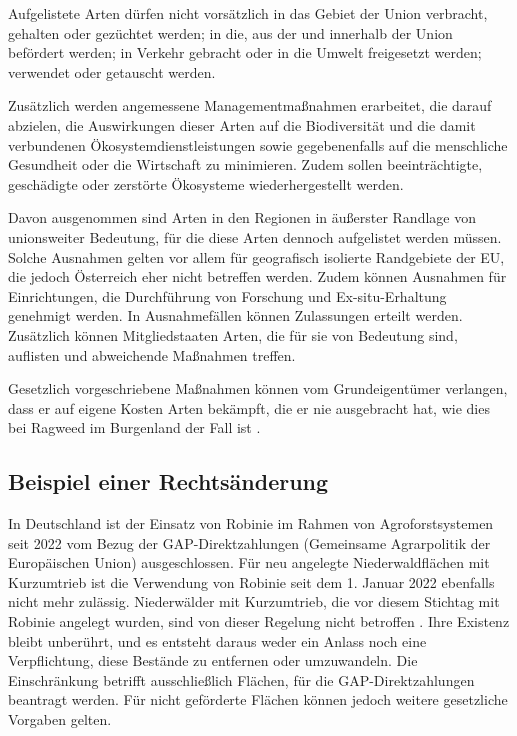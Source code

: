 \documentclass[twocolumn]{scrartcl}
\begin{document}
Aufgelistete Arten dürfen nicht vorsätzlich in das Gebiet der Union
verbracht, gehalten oder gezüchtet werden; in die, aus der und
innerhalb der Union befördert werden; in Verkehr gebracht oder in die
Umwelt freigesetzt werden; verwendet oder getauscht werden.

Zusätzlich werden angemessene Managementmaßnahmen erarbeitet, die
darauf abzielen, die Auswirkungen dieser Arten auf die Biodiversität
und die damit verbundenen Ökosystemdienstleistungen sowie
gegebenenfalls auf die menschliche Gesundheit oder die Wirtschaft zu
minimieren. Zudem sollen beeinträchtigte, geschädigte oder zerstörte
Ökosysteme wiederhergestellt werden.

Davon ausgenommen sind Arten in den Regionen in äußerster Randlage von
unionsweiter Bedeutung, für die diese Arten dennoch aufgelistet werden
müssen. Solche Ausnahmen gelten vor allem für geografisch isolierte
Randgebiete der EU, die jedoch Österreich eher nicht betreffen
werden. Zudem können Ausnahmen für Einrichtungen, die Durchführung von
Forschung und Ex-situ-Erhaltung genehmigt werden. In Ausnahmefällen
können Zulassungen erteilt werden. Zusätzlich können Mitgliedstaaten
Arten, die für sie von Bedeutung sind, auflisten und abweichende
Maßnahmen treffen.

Gesetzlich vorgeschriebene Maßnahmen können vom Grundeigentümer
verlangen, dass er auf eigene Kosten Arten bekämpft, die er nie
ausgebracht hat, wie dies bei Ragweed im Burgenland der Fall ist
\citep{burgenland2021ragweed}.

\subsection{Beispiel einer Rechtsänderung}%

In Deutschland ist der Einsatz von Robinie im Rahmen von
Agroforstsystemen seit 2022 vom Bezug der GAP-Direktzahlungen
(Gemeinsame Agrarpolitik der Europäischen Union) ausgeschlossen. Für
neu angelegte Niederwaldflächen mit Kurzumtrieb ist die Verwendung von
Robinie seit dem 1. Januar 2022 ebenfalls nicht mehr
zulässig. Niederwälder mit Kurzumtrieb, die vor diesem Stichtag mit
Robinie angelegt wurden, sind von dieser Regelung nicht betroffen
\citep{deLaw2022gap}. Ihre Existenz bleibt unberührt, und es entsteht
daraus weder ein Anlass noch eine Verpflichtung, diese Bestände zu
entfernen oder umzuwandeln. Die Einschränkung betrifft ausschließlich
Flächen, für die GAP-Direktzahlungen beantragt werden. Für nicht
geförderte Flächen können jedoch weitere gesetzliche Vorgaben gelten.
\end{document}
